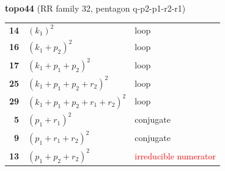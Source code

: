 \documentclass[10pt]{article}
\begin{document}
\begin{minipage}[t]{0.48\textwidth}
{}\\[2mm]\textbf{topo44} (RR family 32, pentagon q-p2-p1-r2-r1)\\[2pt]{\footnotesize\begin{tabular}{@{}r@{\ \ }l@{\ \ }l@{}}\textbf{14} & $(k_1)^2$ & loop\\
\textbf{16} & $(k_1+p_2)^2$ & loop\\
\textbf{17} & $(k_1+p_1+p_2)^2$ & loop\\
\textbf{25} & $(k_1+p_1+p_2+r_2)^2$ & loop\\
\textbf{29} & $(k_1+p_1+p_2+r_1+r_2)^2$ & loop\\
\textbf{5} & $(p_1+r_1)^2$ & conjugate\\
\textbf{9} & $(p_1+r_1+r_2)^2$ & conjugate\\
\textbf{13} & $(p_1+p_2+r_2)^2$ & \textcolor{red}{irreducible numerator}\\\end{tabular}}\end{minipage}

\bigskip
\end{document}
